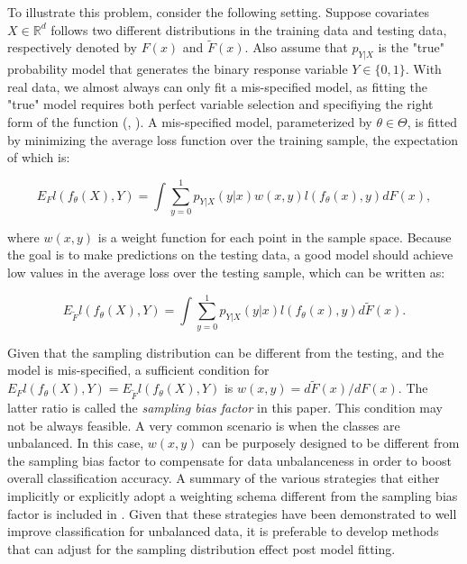 \documentclass{article} %
\begin{document}
To illustrate this problem, consider the following setting. Suppose covariates $X\in \mathbb R^d$ follows two different distributions in the training data and testing data, respectively denoted by $F(x)$ and $\tilde F(x)$. Also assume that $p_{Y|X}$ is the "true" probability model that generates the binary response variable $Y\in\{0,1\}$. With real data, we almost always can only fit a mis-specified model, as fitting the "true" model requires both perfect variable selection and specifiying the right form of the function (\cite{begg1990consequences}, \cite{lv2014model}). A mis-specified model, parameterized by $\theta\in \Theta$, is fitted by minimizing the average loss function over the training sample, the expectation of which is:

\begin{equation}
E_{F}l(f_\theta(X),Y)=\int \sum_{y=0}^1p_{Y|X}(y|x)w(x,y)l(f_\theta(x),y)d F(x),
\end{equation}

 where $w(x,y)$ is a weight function for each point in the sample space. Because the goal is to make predictions on the testing data, a good model should achieve low values in the average loss over the testing sample, which can be written as:

\begin{equation}
E_{\tilde F} l(f_\theta(X),Y)=\int \sum_{y=0}^1p_{Y|X}(y|x)l(f_\theta(x),y)d\tilde F(x).
\end{equation}

Given that the sampling distribution can be different from the testing, and the model is mis-specified, a sufficient condition for $E_{F}l(f_\theta(X),Y)=E_{\tilde F} l(f_\theta(X),Y)$ is $w(x,y)=d\tilde F(x)/dF(x)$. The latter ratio is called the \textit{sampling bias factor} in this paper. This condition may not be always feasible. A very common scenario is when the classes are unbalanced. In this case, $w(x,y)$ can be purposely designed to be different from the sampling bias factor to compensate for data unbalanceness in order to boost overall classification accuracy. A summary of the various strategies that either implicitly or explicitly adopt a weighting schema different from the sampling bias factor is included in \cite{ramyachitra2014imbalanced}. Given that these strategies have been demonstrated to well improve classification for unbalanced data, it is preferable to develop methods that can adjust for the sampling distribution effect post model fitting.
\end{document}
